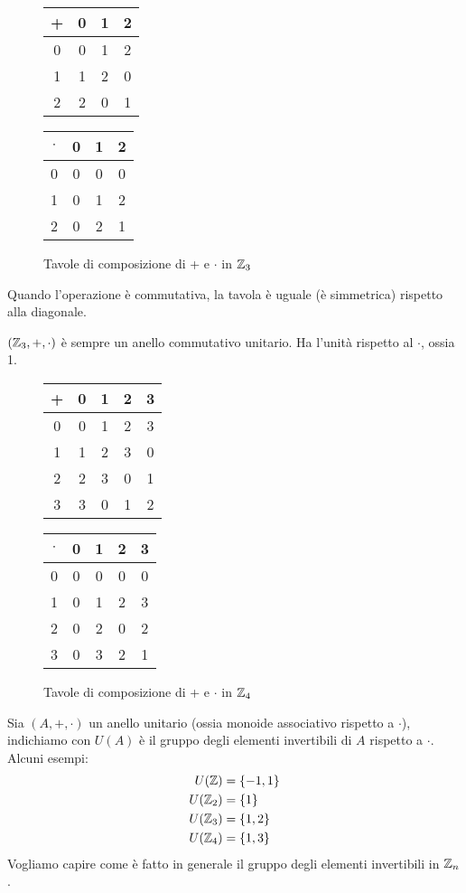\begin{figure}
\centering
\begin{tabular}{c|ccc}
+ & 0 & 1 & 2 \\
\hline
0 & 0 & 1 & 2 \\
1 & 1 & 2 & 0 \\
2 & 2 & 0 & 1
\end{tabular}
\qquad
\begin{tabular}{c|ccc}
$\cdot$ & 0 & 1 & 2 \\
\hline
0 & 0 & 0 & 0 \\
1 & 0 & 1 & 2 \\
2 & 0 & 2 & 1
\end{tabular}
\caption{Tavole di composizione di + e $\cdot$ in $\mathbb{Z}_3$}
\end{figure}

Quando l'operazione \`e commutativa, la tavola \`e uguale (\`e simmetrica) rispetto alla diagonale.

$(\mathbb{Z}_3, +, \cdot)$ \`e sempre un anello commutativo unitario. Ha l'unit\`a rispetto al $\cdot$, ossia 1.

\begin{figure}
\centering
\begin{tabular}{c|cccc}
+ & 0 & 1 & 2 & 3 \\
\hline
0 & 0 & 1 & 2 & 3 \\
1 & 1 & 2 & 3 & 0 \\
2 & 2 & 3 & 0 & 1 \\
3 & 3 & 0 & 1 & 2
\end{tabular}
\qquad
\begin{tabular}{c|cccc}
$\cdot$ & 0 & 1 & 2 & 3 \\
\hline
0 & 0 & 0 & 0 & 0 \\
1 & 0 & 1 & 2 & 3 \\
2 & 0 & 2 & 0 & 2 \\
3 & 0 & 3 & 2 & 1
\end{tabular}
\caption{Tavole di composizione di + e $\cdot$ in $\mathbb{Z}_4$}
\end{figure}

Sia $(A, +, \cdot)$ un anello unitario (ossia monoide associativo rispetto a $\cdot$), indichiamo con $U(A)$ \`e il gruppo degli elementi invertibili di $A$ rispetto a $\cdot$. Alcuni esempi:
\begin{align*}
U(\mathbb{Z}) &= \{ -1, 1 \} \\
U(\mathbb{Z}_2) &= \{ 1 \} \\
U(\mathbb{Z}_3) &= \{ 1,  2 \} \\
U(\mathbb{Z}_4) &= \{1, 3\}
\end{align*}
Vogliamo capire come \`e fatto in generale il gruppo degli elementi invertibili in $\mathbb{Z}_n$.

